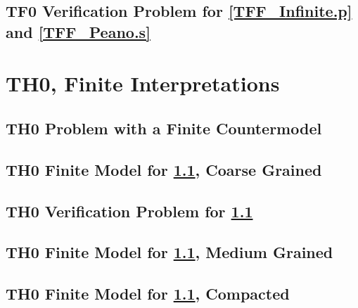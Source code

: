 \documentclass{easychair}
\begin{document}
\newpage
\subsection{TF0 Verification Problem for \ref{TFF_Infinite.p} and \ref{TFF_Peano.s}}
\label{TFF_Peano.s.p}
\begin{small}

\end{small}

\newpage
\section{TH0, Finite Interpretations}
\label{TH0Finite}

\subsection{TH0 Problem with a Finite Countermodel}
\label{THF_Finite.p}
\begin{small}

\end{small}

\newpage
\subsection{TH0 Finite Model for \ref{THF_Finite.p}, Coarse Grained}
\label{THF_Finite.s}
\begin{small}

\end{small}

\newpage
\subsection{TH0 Verification Problem for \ref{THF_Finite.p}}
\label{THF_Finite.s.p}
\begin{small}

\end{small}

\newpage
\subsection{TH0 Finite Model for \ref{THF_Finite.p}, Medium Grained}
\label{THF_Finite_Medium.s}
\begin{small}

\end{small}

\newpage
\subsection{TH0 Finite Model for \ref{THF_Finite.p}, Compacted}
\label{THF_Finite_Compact.s}
\begin{small}

\end{small}
\end{document}
